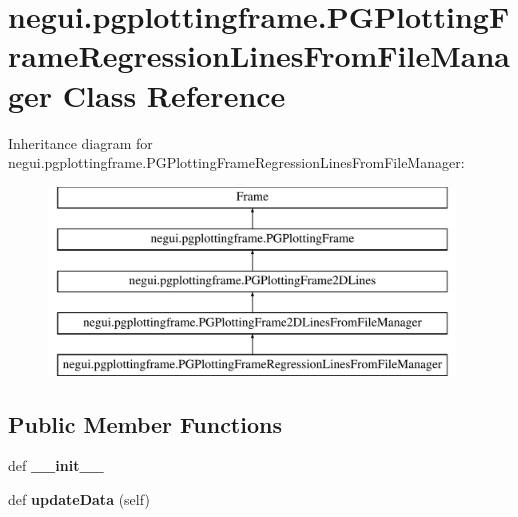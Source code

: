 \hypertarget{classnegui_1_1pgplottingframe_1_1PGPlottingFrameRegressionLinesFromFileManager}{}\section{negui.\+pgplottingframe.\+P\+G\+Plotting\+Frame\+Regression\+Lines\+From\+File\+Manager Class Reference}
\label{classnegui_1_1pgplottingframe_1_1PGPlottingFrameRegressionLinesFromFileManager}
Inheritance diagram for negui.\+pgplottingframe.\+P\+G\+Plotting\+Frame\+Regression\+Lines\+From\+File\+Manager\+:\begin{figure}[H]
\begin{center}
\leavevmode
\includegraphics[height=5.000000cm]{classnegui_1_1pgplottingframe_1_1PGPlottingFrameRegressionLinesFromFileManager}
\end{center}
\end{figure}
\subsection*{Public Member Functions}
\begin{DoxyCompactItemize}
\item 
def {\bfseries \+\_\+\+\_\+init\+\_\+\+\_\+}\hypertarget{classnegui_1_1pgplottingframe_1_1PGPlottingFrameRegressionLinesFromFileManager_ae43e3d6e7d570bbcbc2a0ab23fca59fd}{}\label{classnegui_1_1pgplottingframe_1_1PGPlottingFrameRegressionLinesFromFileManager_ae43e3d6e7d570bbcbc2a0ab23fca59fd}

\item 
def {\bfseries update\+Data} (self)\hypertarget{classnegui_1_1pgplottingframe_1_1PGPlottingFrameRegressionLinesFromFileManager_ac9f38df6487db0c461f0b0bd146dbbe4}{}\label{classnegui_1_1pgplottingframe_1_1PGPlottingFrameRegressionLinesFromFileManager_ac9f38df6487db0c461f0b0bd146dbbe4}

\end{DoxyCompactItemize}
